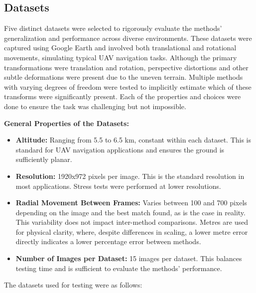 \subsection{Datasets}

Five distinct datasets were selected to rigorously evaluate the methods' generalization and performance across diverse environments. These datasets were captured using Google Earth and involved both translational and rotational movements, simulating typical UAV navigation tasks. Although the primary transformations were translation and rotation, perspective distortions and other subtle deformations were present due to the uneven terrain. Multiple methods with varying degrees of freedom were tested to implicitly estimate which of these transforms were significantly present. Each of the properties and choices were done to ensure the task was challenging but not impossible.

\textbf{General Properties of the Datasets:}
\begin{itemize}
    \item \textbf{Altitude:} Ranging from 5.5 to 6.5 km, constant within each dataset. This is standard for UAV navigation applications and ensures the ground is sufficiently planar.
    \item \textbf{Resolution:} 1920x972 pixels per image. This is the standard resolution in most applications. Stress tests were performed at lower resolutions.
    \item \textbf{Radial Movement Between Frames:} Varies between 100 and 700 pixels depending on the image and the best match found, as is the case in reality. This variability does not impact inter-method comparisons. Metres are used for physical clarity, where, despite differences in scaling, a lower metre error directly indicates a lower percentage error between methods.
    \item \textbf{Number of Images per Dataset:} 15 images per dataset. This balances testing time and is sufficient to evaluate the methods' performance. 
\end{itemize}

The datasets used for testing were as follows:

